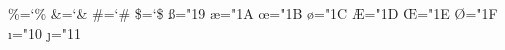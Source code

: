 \def\m@ketabbox{\begingroup
  \global\setbox\tabsyet\copy\tabs
  \global\setbox\tabsdone\null
  \def\cr{\@crtrue\crcr\egroup\egroup
    \ifus@\unvbox\z@\lastbox\fi\endgroup
    \setbox\tabs\hbox{\unhbox\tabsyet\unhbox\tabsdone}}%
  \setbox\z@\vbox\bgroup\@crfalse
    \ialign\bgroup&\t@bbox##\t@bb@x\crcr}

\def\t@bbox{\setbox\z@\hbox\bgroup}
\def\t@bb@x{\if@cr\egroup %
  \else\hss\egroup \global\setbox\tabsyet\hbox{\unhbox\tabsyet
      \global\setbox\@ne\lastbox}%
    \ifvoid\@ne\global\setbox\@ne\hbox to\wd\z@{}%
    \else\setbox\z@\hbox to\wd\@ne{\unhbox\z@}\fi
    \global\setbox\tabsdone\hbox{\box\@ne\unhbox\tabsdone}\fi
  \box\z@}

\def\hang{\hangindent\parindent}
\def\textindent#1{\indent\llap{#1\enspace}\ignorespaces}
\def\item{\par\hang\textindent}
\def\itemitem{\par\indent \hangindent2\parindent \textindent}
\def\narrower{\advance\leftskip\parindent
  \advance\rightskip\parindent}

\outer{}
\outer{}

\def\raggedright{\rightskip\z@ plus2em \spaceskip.3333em \xspaceskip.5em\relax}
\def\ttraggedright{\tt\rightskip\z@ plus2em\relax} %

\chardef\%=`\%
\chardef\&=`\&
\chardef\#=`\#
\chardef\$=`\$
\chardef\ss="19
\chardef\ae="1A
\chardef\oe="1B
\chardef\o="1C
\chardef\AE="1D
\chardef\OE="1E
\chardef\O="1F
\chardef\i="10 \chardef\j="11 %
\def\aa{\accent23a}
\def\l{\char32l}
\def\L{\leavevmode\setbox0\hbox{L}\hbox to\wd0{\hss\char32L}}

\def\leavevmode{\unhbox\voidb@x} %
\def\_{\leavevmode \kern.06em \vbox{\hrule width.3em}}
\def\AA{\leavevmode\setbox0\hbox{!}\dimen@\ht0\advance\dimen@-1ex%
  \rlap{\raise.67\dimen@\hbox{\char'27}}A}

\def\mathhexbox#1#2#3{\leavevmode
  \hbox{$\m@th \mathchar"#1#2#3$}}
\def\dag{\mathhexbox279}
\def\ddag{\mathhexbox27A}
\def\S{\mathhexbox278}
\def\P{\mathhexbox27B}
\def\Orb{\mathhexbox20D}


